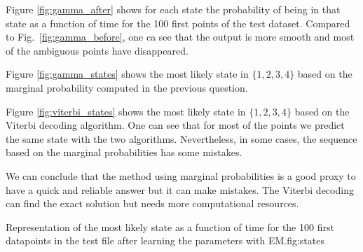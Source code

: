\documentclass{article}
\begin{document}

Figure \ref{fig:gamma_after} shows for each state the probability of being in that state as a function of time for the 100 first points of the test dataset. Compared to Fig.~\ref{fig:gamma_before}, one ca see that the output is more smooth and most of the ambiguous points have disappeared. 



Figure \ref{fig:gamma_states} shows the most likely state in $\{1, 2, 3, 4\}$ based on the marginal probability computed in the previous question.


Figure \ref{fig:viterbi_states} shows the most likely state in $\{1, 2, 3, 4\}$ based on the Viterbi decoding algorithm. One can see that for most of the points we predict the same state with the two algorithms. Nevertheless, in some cases, the sequence based on the marginal probabilities has some mistakes.

We can conclude that the method using marginal probabilities is a good proxy to have a quick and reliable answer but it can make mistakes. The Viterbi decoding can find the exact solution but needs more computational resources. 

          {}
          {Representation of the most likely state as a function of time for the 100 first datapoints in the test file after learning the parameters with EM.}{fig:states}
          
\end{document}
